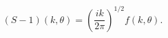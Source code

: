 \begin{equation}
(S-1) (k, \theta) = \left(\frac{ik}{2\pi}\right)^{1/2} f(k, \theta).
\end{equation}

